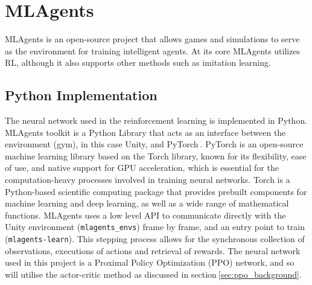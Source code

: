 \section{MLAgents}
MLAgents is an open-source project that allows games and simulations to serve as the environment for training intelligent agents. At its core MLAgents utilizes RL, although it also supports other methods such as imitation learning.

\subsection{Python Implementation}
The neural network used in the reinforcement learning is implemented in Python. MLAgents toolkit is a Python Library that acts as an interface between the environment (gym), in this case Unity, and PyTorch$~$\cite{paszke2019pytorch}. PyTorch is an open-source machine learning library based on the Torch library, known for its flexibility, ease of use, and native support for GPU acceleration, which is essential for the computation-heavy processes involved in training neural networks. Torch is a Python-based scientific computing package that provides prebuilt components for machine learning and deep learning, as well as a wide range of mathematical functions. MLAgents uses a low level API to communicate directly with the Unity environment (\texttt{mlagents\_envs}) frame by frame, and an entry point to train (\texttt{mlagents-learn}). This stepping process allows for the synchronous collection of observations, executions of actions and retrieval of rewards. The neural network used in this project is a Proximal Policy Optimization (PPO) network, and so will utilise the actor-critic method as discussed in section$~$\ref{sec:ppo_background}.

